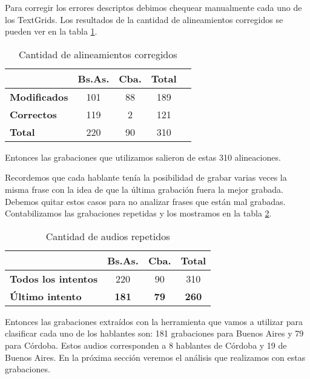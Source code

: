 Para corregir los errores descriptos debimos chequear manualmente cada uno de los TextGrids. Los resultados de la cantidad de alineamientos corregidos se pueden ver en la tabla \ref{eva_table_align}.

\begin{table}[h]
\centering
\begin{tabular}{|l|c|c|c|c|}
\hline
\textbf{}  & \textbf{Bs.As. } & \textbf{Cba.} & \textbf{Total} \\ \hline
\textbf{Modificados}  & 101 & 88 & 189 \\ \hline
\textbf{Correctos}  & 119 & 2 & 121 \\ \hline
\textbf{Total} & 220 & 90 & 310 \\ \hline
\end{tabular}
\caption{Cantidad de alineamientos corregidos}
\label{eva_table_align}
\end{table}

Entonces las grabaciones que utilizamos salieron de estas 310 alineaciones. 

Recordemos que cada hablante tenía la posibilidad de grabar varias veces la misma frase con la idea de que la última grabación fuera la mejor grabada. Debemos quitar estos casos para no analizar frases que están mal grabadas. Contabilizamos las grabaciones repetidas y los mostramos en la tabla \ref{eva_table_rep}.

\begin{table}[H]
\centering
\begin{tabular}{|l|c|c|c|}
\hline
\textbf{}  & \textbf{Bs.As. } & \textbf{Cba.} & \textbf{Total} \\ \hline
\textbf{Todos los intentos}  & 220 & 90 & 310 \\ \hline
\textbf{Último intento}  & \textbf{181} & \textbf{79} & \textbf{260} \\ \hline
\end{tabular}
\caption{Cantidad de audios repetidos}
\label{eva_table_rep}
\end{table}

Entonces las grabaciones extraídos con la herramienta que vamos a utilizar para clasificar cada uno de los hablantes son: 181 grabaciones para Buenos Aires y 79 para Córdoba. Estos audios corresponden a 8 hablantes de Córdoba y 19 de Buenos Aires.
En la próxima sección veremos el análisis que realizamos con estas grabaciones. 